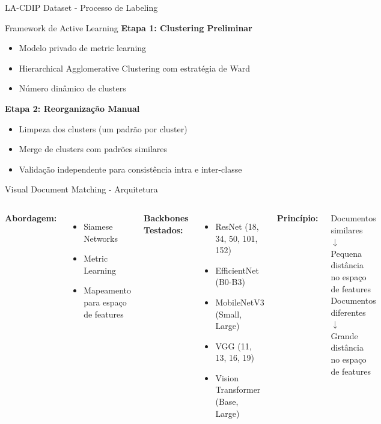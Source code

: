 \begin{frame}{LA-CDIP Dataset - Processo de Labeling}
\begin{block}{Framework de Active Learning}
\textbf{Etapa 1: Clustering Preliminar}
\begin{itemize}
    \item Modelo privado de metric learning
    \item Hierarchical Agglomerative Clustering com estratégia de Ward
    \item Número dinâmico de clusters
\end{itemize}

\textbf{Etapa 2: Reorganização Manual}
\begin{itemize}
    \item Limpeza dos clusters (um padrão por cluster)
    \item Merge de clusters com padrões similares
    \item Validação independente para consistência intra e inter-classe
\end{itemize}
\end{block}
\end{frame}

\begin{frame}{Visual Document Matching - Arquitetura}
\begin{columns}
\textbf{Abordagem:}
\begin{itemize}
    \item Siamese Networks
    \item Metric Learning
    \item Mapeamento para espaço de features
\end{itemize}

\textbf{Backbones Testados:}
\begin{itemize}
    \item ResNet (18, 34, 50, 101, 152)
    \item EfficientNet (B0-B3)
    \item MobileNetV3 (Small, Large)
    \item VGG (11, 13, 16, 19)
    \item Vision Transformer (Base, Large)
\end{itemize}

\textbf{Princípio:}
\begin{center}
Documentos similares\\
$\downarrow$\\
Pequena distância\\
no espaço de features\\
\vspace{0.3cm}
Documentos diferentes\\
$\downarrow$\\
Grande distância\\
no espaço de features
\end{center}
\end{columns}
\end{frame}

